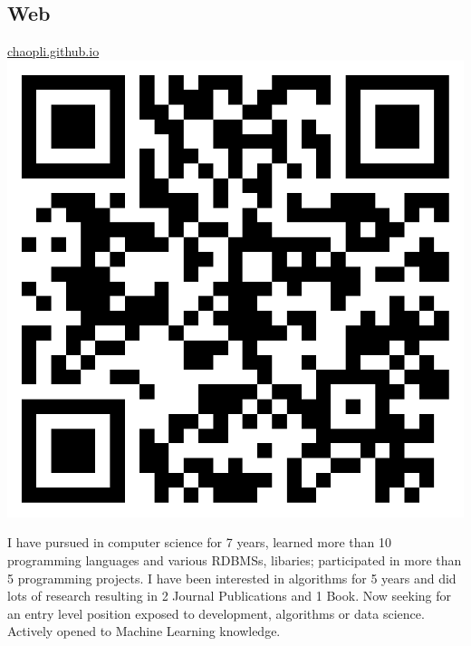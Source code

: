 \documentclass[]{friggeri-cv}
\begin{document}
\begin{aside}
	\section{Web}
	\href{http://chaopli.github.io}{chaopli.github.io}
	\includegraphics[scale=0.1]{img/Chao_Li.png}
\end{aside}


I have pursued in computer science for 7 years, learned more than 10 programming
languages and various RDBMSs, libaries; participated in more than 5 programming
projects. I have been interested in algorithms for 5 years and did lots of
research resulting in 2 Journal Publications and 1 Book. Now seeking for an
entry level position exposed to development, algorithms or data science.
Actively opened to Machine Learning knowledge.
\end{document}
